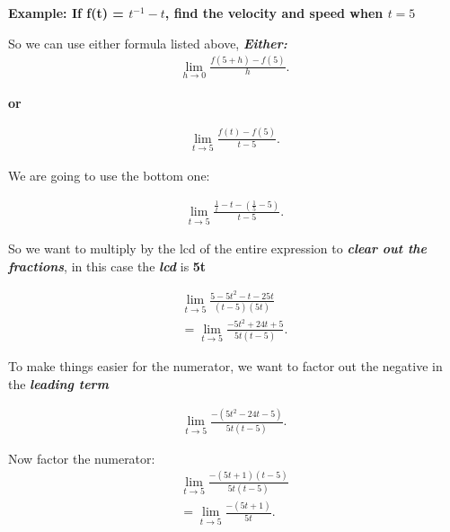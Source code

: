 \documentclass{report}
\begin{document}
        \pagebreak \bigbreak \noindent
        \begin{large}
            \textbf{Example: If f(t) = $t^{-1} -t$, find the velocity and speed when $t=5$}
        \end{large}

        \bigbreak \noindent \bigbreak \noindent 
        So we can use either formula listed above, \textbf{\textit{Either:}}
        \begin{align*}
            \lim\limits_{h \to 0}{ \frac{f(5+h) - f(5)}{h}} 
        .\end{align*}

        \bigbreak \noindent 
        \begin{center}
            \textbf{or}
        \end{center}

        \begin{align*}
            \lim\limits_{t \to 5}{ \frac{f(t) - f(5)}{t-5}}
        .\end{align*}

        \bigbreak \noindent 
        We are going to use the bottom one:
        \bigbreak \noindent 

        \bigbreak \noindent 
        \begin{align*}
            \lim\limits_{t \to 5}{ \frac{ \frac{1}{t} - t  - ( \frac{1}{5} - 5)}{t -5}}
        .\end{align*}

        \bigbreak \noindent 
        So we want to multiply by the lcd of the entire expression to \textbf{\textit{clear out the fractions}},
        in this case the \textbf{\textit{lcd}} is \textbf{5t}

        \begin{align*}
            \lim\limits_{t \to 5}{ \frac{5 - 5t^2 - t-25t}{(t-5)(5t)}} \\ 
            = \lim\limits_{t \to 5}{ \frac{-5t^2+24t+5}{5t(t-5)}}
        .\end{align*}

        \bigbreak \noindent 
        To make things easier for the numerator, we want to factor out the negative in the \textbf{\textit{leading term}}

        \begin{align*}
            \lim\limits_{t \to 5}{ \frac{- (5t^2-24t-5)}{5t(t-5)}}
        .\end{align*}

        \bigbreak \noindent 
        Now factor the numerator:
        \begin{align*}
            \lim\limits_{t \to 5}{ \frac{- (5t+1)(t-5)}{5t(t-5)}} \\
            = \lim\limits_{t \to 5}{ \frac{-(5t+1)}{5t}}
        .\end{align*}
\end{document}
